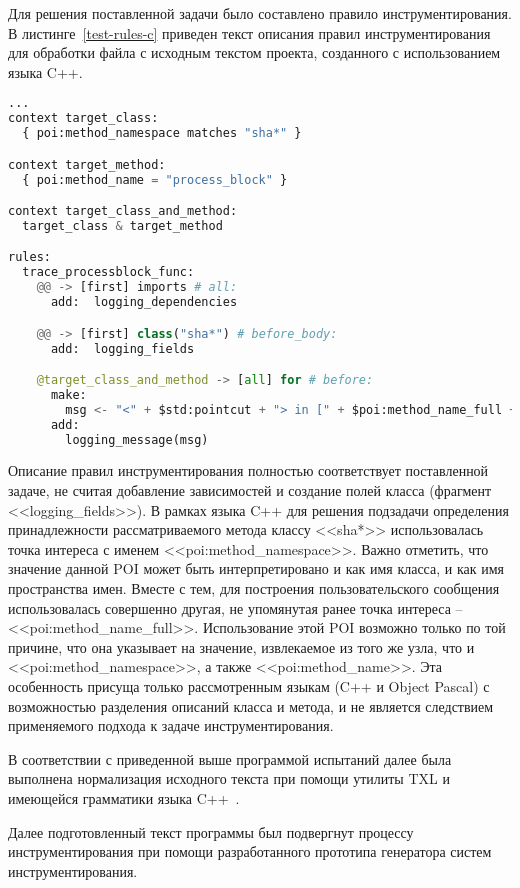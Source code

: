 Для решения поставленной задачи было составлено правило инструментирования.
В листинге~\ref{test-rules-c} приведен текст описания правил инструментирования для обработки файла с исходным текстом проекта, созданного с использованием языка C++.

\begin{lstlisting}[frame=single, language=Python, label={test-rules-c}, caption={Описание правил инструментирования. C++-проект.}]
...
context target_class:
  { poi:method_namespace matches "sha*" }

context target_method:
  { poi:method_name = "process_block" }

context target_class_and_method:
  target_class & target_method

rules:
  trace_processblock_func:
    @@ -> [first] imports # all:
      add:  logging_dependencies

    @@ -> [first] class("sha*") # before_body:
      add:  logging_fields

    @target_class_and_method -> [all] for # before:
      make:
        msg <- "<" + $std:pointcut + "> in [" + $poi:method_name_full + "] method";
      add:
        logging_message(msg)
\end{lstlisting}

Описание правил инструментирования полностью соответствует поставленной задаче, не считая добавление зависимостей и создание полей класса (фрагмент <<logging\_fields>>).
В рамках языка C++ для решения подзадачи определения принадлежности рассматриваемого метода классу <<sha*>> использовалась точка интереса с именем <<poi:method\_namespace>>.
Важно отметить, что значение данной POI может быть интерпретировано и как имя класса, и как имя пространства имен.
Вместе с тем, для построения пользовательского сообщения использовалась совершенно другая, не упомянутая ранее точка интереса -- <<poi:method\_name\_full>>.
Использование этой POI возможно только по той причине, что она указывает на значение, извлекаемое из того же узла, что и <<poi:method\_namespace>>, а также <<poi:method\_name>>.
Эта особенность присуща только рассмотренным языкам (C++ и Object Pascal) с возможностью разделения описаний класса и метода, и не является следствием применяемого подхода к задаче инструментирования.

В соответствии с приведенной выше программой испытаний далее была выполнена нормализация исходного текста при помощи утилиты TXL и имеющейся грамматики языка C++~\cite{txl-resources}.

Далее подготовленный текст программы был подвергнут процессу инструментирования при помощи разработанного прототипа генератора систем инструментирования.

